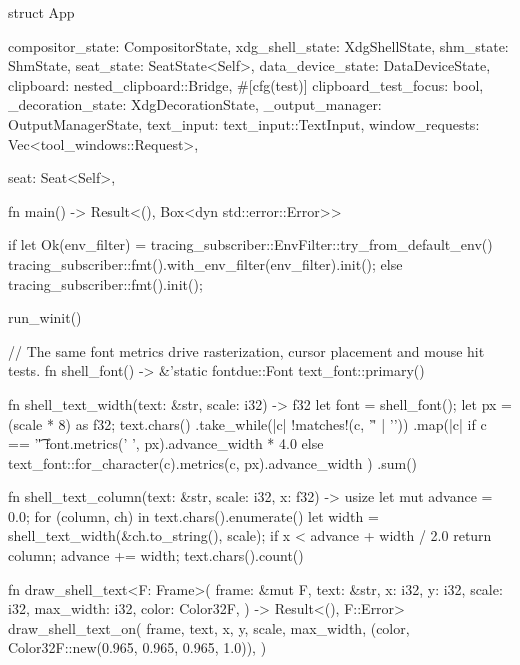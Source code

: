 struct App {
    compositor_state: CompositorState,
    xdg_shell_state: XdgShellState,
    shm_state: ShmState,
    seat_state: SeatState<Self>,
    data_device_state: DataDeviceState,
    clipboard: nested_clipboard::Bridge,
    #[cfg(test)] clipboard_test_focus: bool,
    _decoration_state: XdgDecorationState,
    _output_manager: OutputManagerState,
    text_input: text_input::TextInput,
    window_requests: Vec<tool_windows::Request>,

    seat: Seat<Self>,
}

fn main() -> Result<(), Box<dyn std::error::Error>> {
    if let Ok(env_filter) = tracing_subscriber::EnvFilter::try_from_default_env() {
        tracing_subscriber::fmt().with_env_filter(env_filter).init();
    } else {
        tracing_subscriber::fmt().init();
    }

    run_winit()
}

// The same font metrics drive rasterization, cursor placement and mouse hit tests.
fn shell_font() -> &'static fontdue::Font {
    text_font::primary()
}

fn shell_text_width(text: &str, scale: i32) -> f32 {
    let font = shell_font();
    let px = (scale * 8) as f32;
    text.chars()
        .take_while(|c| !matches!(c, '\r' | '\n'))
        .map(|c| {
            if c == '\t' {
                font.metrics(' ', px).advance_width * 4.0
            } else {
                text_font::for_character(c).metrics(c, px).advance_width
            }
        })
        .sum()
}

fn shell_text_column(text: &str, scale: i32, x: f32) -> usize {
    let mut advance = 0.0;
    for (column, ch) in text.chars().enumerate() {
        let width = shell_text_width(&ch.to_string(), scale);
        if x < advance + width / 2.0 {
            return column;
        }
        advance += width;
    }
    text.chars().count()
}

fn draw_shell_text<F: Frame>(
    frame: &mut F,
    text: &str,
    x: i32,
    y: i32,
    scale: i32,
    max_width: i32,
    color: Color32F,
) -> Result<(), F::Error> {
    draw_shell_text_on(
        frame,
        text,
        x,
        y,
        scale,
        max_width,
        (color, Color32F::new(0.965, 0.965, 0.965, 1.0)),
    )
}

